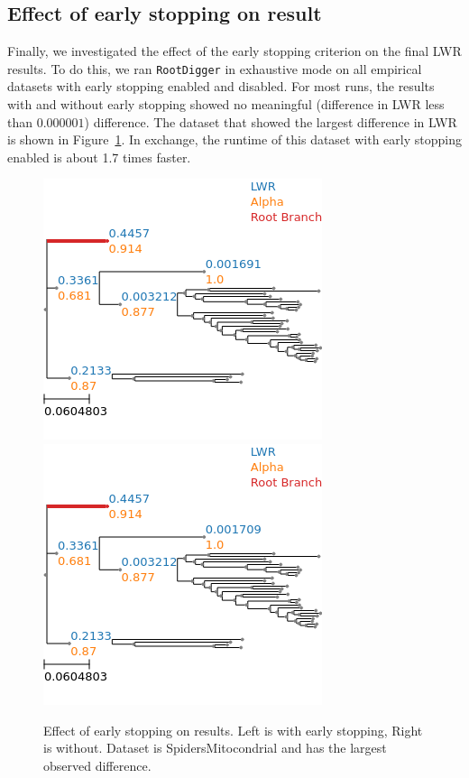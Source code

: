\documentclass{article}
\newcommand{\RootDiggertt}{\texttt{RootDigger}}
\begin{document}
\subsection{Effect of early stopping on result}

Finally, we investigated the effect of the early stopping criterion on the final
LWR results. To do this, we ran \RootDiggertt{} in exhaustive mode on all
empirical datasets with early stopping enabled and disabled. For most runs, the
results with and without early stopping showed no meaningful (difference in LWR
less than $0.000001$) difference. The dataset that showed the largest difference
in LWR is shown in Figure~\ref{fig:es_mito}. In exchange, the runtime of this
dataset with early stopping enabled is about 1.7 times faster.


\begin{figure}[H]
  \begin{center}
    \includegraphics[width=.4\linewidth]{figs/early_stop_tests/es_test_mito_no_outgroup.png}
    \includegraphics[width=.4\linewidth]{figs/early_stop_tests/es_test_mito_no_outgroup_noes.png}
    \caption{Effect of early stopping on results. Left is with early stopping,
    Right is without. Dataset is SpidersMitocondrial and has the largest
  observed difference.}
    \label{fig:es_mito}
  \end{center}
\end{figure}
\end{document}
